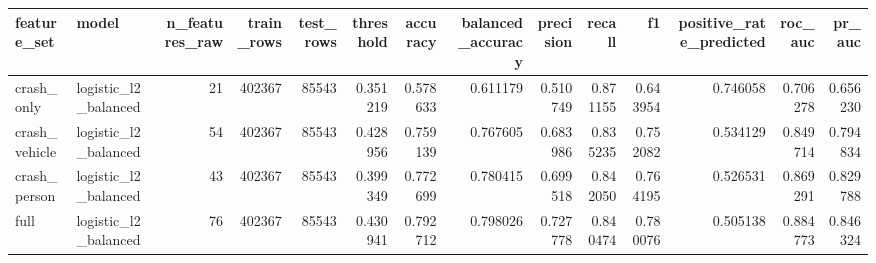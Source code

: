 \begin{tabular}{llrrrrrrrrrrrr}
\toprule
feature_set & model & n_features_raw & train_rows & test_rows & threshold & accuracy & balanced_accuracy & precision & recall & f1 & positive_rate_predicted & roc_auc & pr_auc \\
\midrule
crash_only & logistic_l2_balanced & 21 & 402367 & 85543 & 0.351219 & 0.578633 & 0.611179 & 0.510749 & 0.871155 & 0.643954 & 0.746058 & 0.706278 & 0.656230 \\
crash_vehicle & logistic_l2_balanced & 54 & 402367 & 85543 & 0.428956 & 0.759139 & 0.767605 & 0.683986 & 0.835235 & 0.752082 & 0.534129 & 0.849714 & 0.794834 \\
crash_person & logistic_l2_balanced & 43 & 402367 & 85543 & 0.399349 & 0.772699 & 0.780415 & 0.699518 & 0.842050 & 0.764195 & 0.526531 & 0.869291 & 0.829788 \\
full & logistic_l2_balanced & 76 & 402367 & 85543 & 0.430941 & 0.792712 & 0.798026 & 0.727778 & 0.840474 & 0.780076 & 0.505138 & 0.884773 & 0.846324 \\
\bottomrule
\end{tabular}
